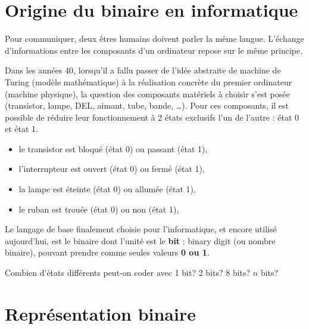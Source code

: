 \def\level{Première}  %
\def\course{NSI}
\def\chaptername{Représentation des entiers positifs} %
\def\docname{RD01}        %

\pagestyle{cours_FP}
\makeheader{} %

\section{Origine du binaire en informatique}

 Pour communiquer, deux êtres humains doivent parler la même langue. L'échange d'informations entre les composants d'un ordinateur repose sur le même principe.

 Dans les années 40, lorsqu'il a fallu passer de l'idée abstraite de machine de Turing (modèle mathématique) à la réalisation concrète du premier ordinateur (machine physique), la question des composants matériels à choisir s'est posée (transistor, lampe, DEL, aimant, tube, bande, \ldots{}). Pour ces composants, il est possible de réduire leur fonctionnement à 2 états exclusifs l'un de l'autre : état 0 et état 1.

 \begin{itemize}
		\item     le transistor est bloqué (état 0) ou passant (état 1),
		\item     l'interrupteur est ouvert (état 0) ou fermé (état 1),
		\item     la lampe est éteinte (état 0) ou allumée (état 1),
		\item     le ruban est trouée (état 0) ou non (état 1),	
 \end{itemize}

 	Le langage de base finalement choisie pour l'informatique, et encore utilisé aujourd'hui, est le binaire dont l'unité est le \textbf{bit} : binary digit (ou nombre binaire), pouvant prendre comme seules valeurs \textbf{0 ou 1}.


	\begin{exercice_cours}{Combien d'états différents peut-on coder avec 1 bit? 2 bits? 8 bits? $n$ bits? \dotfill}{}
	\end{exercice_cours}

	\section{Représentation binaire}

